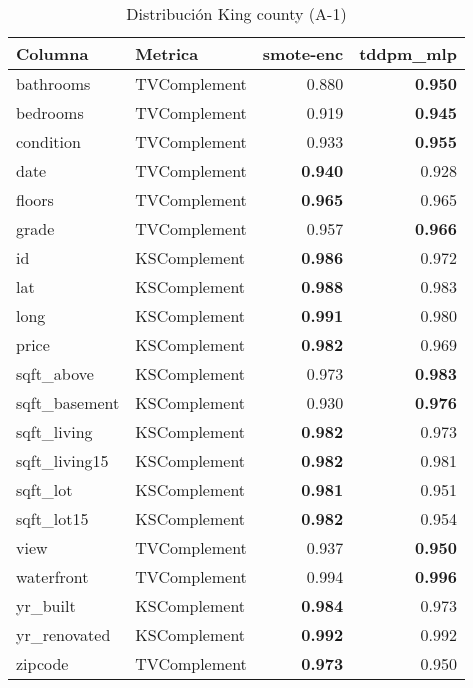 \begin{table}[H]
\centering
\caption{Distribución King county (A-1)}
\label{table-shape-king county-a-1}
\begin{tabular}{|l|l|r|r|}
\hline
\rowcolor[gray]{0.8}
Columna & Metrica & smote-enc & tddpm\_mlp \\
\hline bathrooms & TVComplement & 0.880 & \bfseries 0.950 \\
\hline bedrooms & TVComplement & 0.919 & \bfseries 0.945 \\
\hline condition & TVComplement & 0.933 & \bfseries 0.955 \\
\hline date & TVComplement & \bfseries 0.940 & 0.928 \\
\hline floors & TVComplement & \bfseries 0.965 & 0.965 \\
\hline grade & TVComplement & 0.957 & \bfseries 0.966 \\
\hline id & KSComplement & \bfseries 0.986 & 0.972 \\
\hline lat & KSComplement & \bfseries 0.988 & 0.983 \\
\hline long & KSComplement & \bfseries 0.991 & 0.980 \\
\hline price & KSComplement & \bfseries 0.982 & 0.969 \\
\hline sqft\_above & KSComplement & 0.973 & \bfseries 0.983 \\
\hline sqft\_basement & KSComplement & 0.930 & \bfseries 0.976 \\
\hline sqft\_living & KSComplement & \bfseries 0.982 & 0.973 \\
\hline sqft\_living15 & KSComplement & \bfseries 0.982 & 0.981 \\
\hline sqft\_lot & KSComplement & \bfseries 0.981 & 0.951 \\
\hline sqft\_lot15 & KSComplement & \bfseries 0.982 & 0.954 \\
\hline view & TVComplement & 0.937 & \bfseries 0.950 \\
\hline waterfront & TVComplement & 0.994 & \bfseries 0.996 \\
\hline yr\_built & KSComplement & \bfseries 0.984 & 0.973 \\
\hline yr\_renovated & KSComplement & \bfseries 0.992 & 0.992 \\
\hline zipcode & TVComplement & \bfseries 0.973 & 0.950 \\
\hline
\end{tabular}
\end{table}

